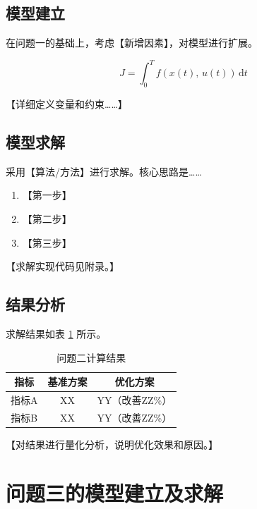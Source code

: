 \documentclass[withoutpreface,bwprint]{cumcmthesis}
\begin{document}
\subsection{模型建立}

在问题一的基础上，考虑【新增因素】，对模型进行扩展。

\begin{equation}
    J = \int_0^T f\!\left(x(t),\, u(t)\right)\,\mathrm{d}t
    \label{eq:obj2}
\end{equation}

【详细定义变量和约束……】

\subsection{模型求解}

采用【算法/方法】进行求解。核心思路是……

\begin{enumerate}
    \item 【第一步】
    \item 【第二步】
    \item 【第三步】
\end{enumerate}

【求解实现代码见附录。】

\subsection{结果分析}

求解结果如表 \cref{tab:result2} 所示。

{\renewcommand{\arraystretch}{1.38}
\setlength{\tabcolsep}{6pt}
\begin{longtable}{ccc}
    \caption{问题二计算结果}\label{tab:result2}\\
    \toprule[1.5pt]
    指标  & 基准方案 & 优化方案       \\
    \midrule[1pt]
    \endfirsthead
    \endhead
    \bottomrule[1.5pt]
    \endlastfoot
    指标A & XX   & YY（改善ZZ\%） \\
    指标B & XX   & YY（改善ZZ\%） \\
\end{longtable}}

【对结果进行量化分析，说明优化效果和原因。】

\section{问题三的模型建立及求解}
\end{document}
